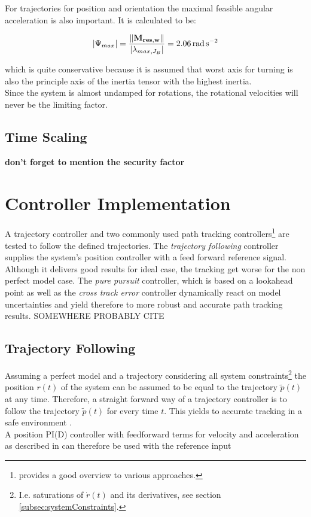 For trajectories for position and orientation the maximal feasible angular acceleration is also important. It is calculated to be:

\begin{equation}
\left|\Psi_{max} \right| =  \frac{\| {\bf M_{res,w}}\|}{\left| \lambda_{max, J_{B}} \right|} = \SI{2.06}{\radian\per\square\second}
\end{equation}

which is quite conservative because it is assumed that worst axis for turning is also the principle axis of the inertia tensor with the highest inertia.\\

Since the system is almost undamped for rotations, the rotational velocities will never be the limiting factor.

\subsection{Time Scaling}
\label{subsec:timeScaling}

{\bf don't forget to mention the security factor}

\section{Controller Implementation}
\label{sec:controllerImplementation}
A trajectory controller and two commonly used path tracking controllers\footnote{\cite{snider} provides a good overview to various approaches.} are tested to follow the defined trajectories. The \textit{trajectory following} controller supplies the system's position controller \cite{meiermueri} with a feed forward reference signal. Although it delivers good results for ideal case, the tracking get worse for the non perfect model case. The \textit{pure pursuit} controller, which is based on a lookahead point as well as the \textit{cross track error} controller dynamically react on model uncertainties and yield therefore to more robust and accurate path tracking results.
SOMEWHERE PROBABLY CITE \cite{deluca}
\subsection{Trajectory Following}
Assuming a perfect model and a trajectory considering all system constraints\footnote{I.e. saturations of $\dot{r}(t)$ and its derivatives, see section \ref{subsec:systemConstraints}.} the position $r\left(t\right)$ of the system can be assumed to be equal to the trajectory $\tilde{p}(t)$ at any time. Therefore, a straight forward way of a trajectory controller is to follow the trajectory $\tilde{p}(t)$ for every time $t$. This yields to accurate tracking in a safe environment \cite{doesegger}.
\\
A position PI(D) controller with feedforward terms for velocity and acceleration as described in \cite{meiermueri} can therefore be used with the reference input

